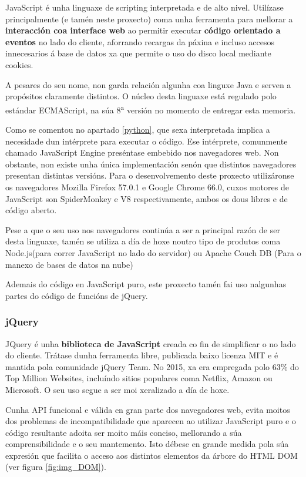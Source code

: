 JavaScript é unha linguaxe de scripting interpretada e de alto nivel. Utilízase principalmente (e tamén neste proxecto) coma unha ferramenta para mellorar a \textbf{interacción coa interface web} ao permitir executar \textbf{código orientado a eventos} no lado do cliente, aforrando recargas da páxina e incluso accesos innecesarios á base de datos xa que permite o uso do disco local mediante cookies. 

A pesares do seu nome, non garda relación algunha coa linguxe Java e serven a propósitos claramente distintos. O núcleo desta linguaxe está regulado polo estándar ECMAScript\textregistered, na súa 8\textsuperscript{a} versión\cite{ecma} no momento de entregar esta memoria. 

Como se comentou no apartado \ref{python}, que sexa interpretada implica a necesidade dun intérprete para executar o código. Ese intérprete, comunmente chamado JavaScript Engine preséntase embebido nos navegadores web. Non obstante, non existe unha única implementación senón que distintos navegadores presentan distintas versións. Para o desenvolvemento deste proxecto utilizáronse os navegadores Mozilla Firefox 57.0.1 e Google Chrome 66.0, cuxos motores de JavaScript son SpiderMonkey e V8 respectivamente\cite{javascript1}, ambos os dous libres e de código aberto.

Pese a que o seu uso nos navegadores continúa a ser a principal razón de ser desta linguaxe, tamén se utiliza a día de hoxe noutro tipo de produtos coma Node.js(para correr JavaScript no lado do servidor) ou Apache Couch DB (Para o manexo de bases de datos na nube)\cite{javascript2} 

Ademais do código en JavaScript puro, este proxecto tamén fai uso nalgunhas partes do código de funcións de jQuery.

\subsubsection{jQuery}
\label{jquery}
JQuery é unha \textbf{biblioteca de JavaScript} creada co fin de simplificar o  no lado do cliente. Trátase dunha ferramenta libre, publicada baixo licenza MIT e é mantida pola comunidade jQuery Team. No 2015, xa era empregada polo 63\% do Top Million Websites\cite{jquery}, incluíndo sitios populares coma Netflix, Amazon ou Microsoft. O seu uso segue a ser moi xeralizado a día de hoxe.  

Cunha API funcional e válida en gran parte dos navegadores web, evita moitos dos problemas de incompatibilidade que aparecen ao utilizar JavaScript puro e o código resultante adoita ser moito máis conciso, mellorando a súa comprensibilidade e o seu mantemento. Isto débese en grande medida pola súa expresión  que facilita o acceso aos distintos elementos da árbore do HTML DOM (ver figura \ref{fig:img_DOM}). 

